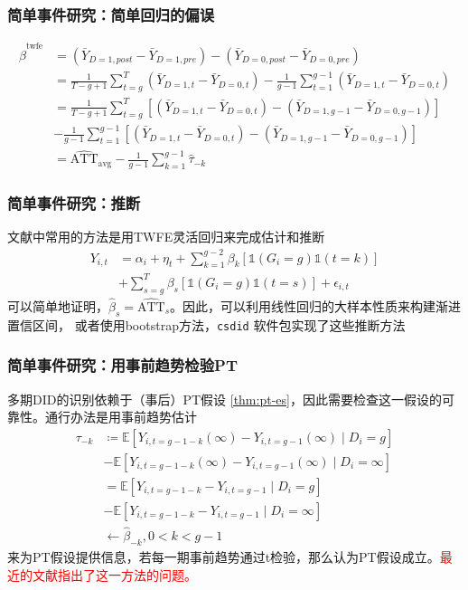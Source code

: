 \documentclass[../didNotes.tex]{subfiles}
\begin{document}
\begin{frame}
  \frametitle{简单事件研究：简单回归的偏误}

  \begin{align*}
    \hat{\beta}^{\text{twfe}} &= (\bar{Y}_{D=1,post} - \bar{Y}_{D=1,pre}) - (\bar{Y}_{D=0,post} - \bar{Y}_{D=0,pre}) \\
    &= \frac{1}{T-g+1} \sum_{t=g}^{T} (\bar{Y}_{D=1,t}-\bar{Y}_{D=0,t}) - \frac{1}{g-1} \sum_{t=1}^{g-1}
    (\bar{Y}_{D=1,t}-\bar{Y}_{D=0,t}) \\
    &= \frac{1}{T-g+1} \sum_{t=g}^{T} \left[ (\bar{Y}_{D=1,t}-\bar{Y}_{D=0,t}) -
    (\bar{Y}_{D=1,g-1}-\bar{Y}_{D=0,g-1}) \right] \\
    &- \frac{1}{g-1} \sum_{t=1}^{g-1} \left[ (\bar{Y}_{D=1,t}-\bar{Y}_{D=0,t}) -
    (\bar{Y}_{D=1,g-1}-\bar{Y}_{D=0,g-1}) \right] \\
    &= \widehat{\text{ATT}}_{\text{avg}} - \frac{1}{g-1} \sum_{k=1}^{g-1} \hat{\tau}_{-k}
  \end{align*}

\end{frame}

\begin{frame}
  \frametitle{简单事件研究：推断}

  文献中常用的方法是用TWFE灵活回归来完成估计和推断
  \begin{align*}
    Y_{i,t} &= \alpha_i + \eta_t + \sum_{k=1}^{g-2} \beta_k \left[ \mathbb{1}(G_i=g)
    \mathbb{1}(t=k) \right] \\
    & +\sum_{s=g}^{T} \beta_s  \left[ \mathbb{1}(G_i=g) \mathbb{1}(t=s) \right] + \epsilon_{i,t} \label{eq:es-twfe}
  \end{align*}
  可以简单地证明，$\hat{\beta}_{s}=\widehat{\text{ATT}}_s$。因此，可以利用线性回归的大样本性质来构建渐进置信区间，
  或者使用bootstrap方法，\texttt{csdid} 软件包实现了这些推断方法

\end{frame}

\begin{frame}
  \frametitle{简单事件研究：用事前趋势检验PT}

  多期DID的识别依赖于（事后）PT假设 \ref{thm:pt-es}，因此需要检查这一假设的可靠性。通行办法是用事前趋势估计
  \begin{align*}
    \tau_{-k} & \coloneqq \mathbb{E}[Y_{i,t=g-1-k}(\infty)-Y_{i,t=g-1}(\infty) \mid D_i = g] \\
    &-\mathbb{E}[Y_{i,t=g-1-k}(\infty)-Y_{i,t=g-1}(\infty) \mid D_i = \infty] \\
    & = \mathbb{E}[Y_{i,t=g-1-k}-Y_{i,t=g-1} \mid D_i = g] \\
    &-\mathbb{E}[Y_{i,t=g-1-k}-Y_{i,t=g-1} \mid D_i = \infty] \\
    &\leftarrow \hat{\beta}_{-k}, 0 < k < g-1
  \end{align*}
  来为PT假设提供信息，若每一期事前趋势通过t检验，那么认为PT假设成立。\textcolor{red}{最近的文献指出了这一方法的问题。}

\end{frame}
\end{document}
